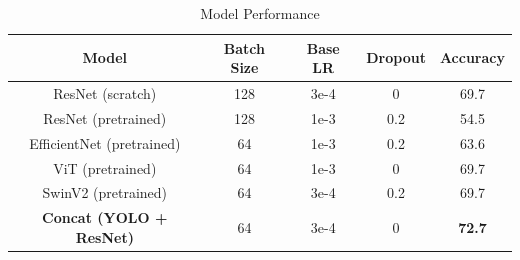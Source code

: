 \documentclass{article}
\begin{document}
\begin{table} [H]
  \renewcommand{\arraystretch}{1.2}
  \caption{Model Performance}
  \label{table_example}
  \centering
  \begin{tabular}{|c|c|c|c|c|}
    \hline
  Model & Batch Size & Base LR & Dropout & Accuracy\\
  \hline
  ResNet (scratch) & 128 & 3e-4 & 0 & 69.7 \\
  \hline
  ResNet (pretrained) & 128 & 1e-3 & 0.2 & 54.5 \\
  \hline
  EfficientNet (pretrained) & 64 & 1e-3 & 0.2 & 63.6 \\
  \hline
  ViT (pretrained) & 64 & 1e-3 & 0 & 69.7 \\
  \hline
  SwinV2 (pretrained) & 64 & 3e-4 & 0.2 & 69.7 \\
  \hline
  \textbf{Concat (YOLO + ResNet)} & 64 & 3e-4 & 0 & \textbf{72.7} \\
  \hline
  \end{tabular}
\end{table}
\end{document}
